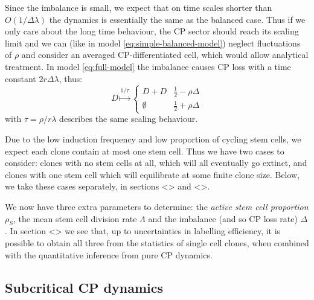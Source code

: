 \documentclass[10pt,UKenglish]{article}
\begin{document}
Since the imbalance is small, we expect that on time scales shorter than
$O(1/\Delta \lambda)$ the dynamics is essentially the same as the balanced case.
Thus if we only care about the long time behaviour, the CP sector should reach
its scaling limit and we can (like in model \ref{eq:simple-balanced-model})
neglect fluctuations of $\rho$ and consider an averaged CP-differentiated cell,
which would allow analytical treatment. In model \ref{eq:full-model} the
imbalance causes CP loss with a time constant $2 r \Delta \lambda$, thus:
\begin{equation}
D \overset{1/\tau}{\longmapsto} \begin{cases}
D+D & \frac{1}{2} - \rho \Delta \\
\emptyset & \frac{1}{2} + \rho \Delta
\end{cases}\label{eq:subcritical-cp-model}
\end{equation}
with $\tau = \rho/r\lambda$ describes the same scaling behaviour.

Due to the low induction frequency and low proportion of cycling stem cells, we
expect each clone contain at most one stem cell. Thus we have two cases to
consider: clones with no stem cells at all, which will all eventually go
extinct, and clones with one stem cell which will equilibrate at some finite
clone size. Below, we take these cases separately, in sections <> and <>.

We now have three extra parameters to determine: the \emph{active stem cell
proportion} $\rho_S$, the mean stem cell division rate $\Lambda$ and the
imbalance (and so CP loss rate) $\Delta$. In section <> we see that, up to
uncertainties in labelling efficiency, it is possible to obtain all three from
the statistics of single cell clones, when combined with the quantitative
inference from pure CP dynamics. 

\subsection{Subcritical CP dynamics}
\end{document}
